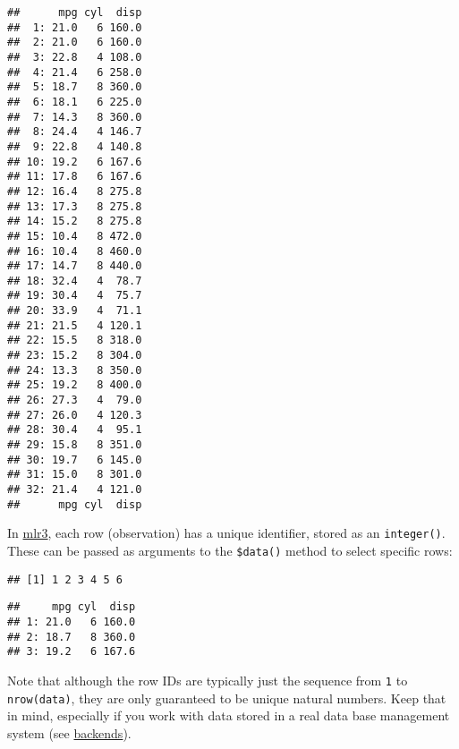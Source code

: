 \documentclass[
]{scrbook}
\newenvironment{Shaded}{\begin{snugshade}}{\end{snugshade}}
\newcommand{\AttributeTok}[1]{\textcolor[rgb]{0.77,0.63,0.00}{#1}}
\newcommand{\CommentTok}[1]{\textcolor[rgb]{0.56,0.35,0.01}{\textit{#1}}}
\newcommand{\DecValTok}[1]{\textcolor[rgb]{0.00,0.00,0.81}{#1}}
\newcommand{\FunctionTok}[1]{\textcolor[rgb]{0.00,0.00,0.00}{#1}}
\newcommand{\NormalTok}[1]{#1}
\newcommand{\SpecialCharTok}[1]{\textcolor[rgb]{0.00,0.00,0.00}{#1}}
\renewenvironment{Shaded} {\begin{snugshade}\small} {\end{snugshade}}
\begin{document}
\begin{verbatim}
##      mpg cyl  disp
##  1: 21.0   6 160.0
##  2: 21.0   6 160.0
##  3: 22.8   4 108.0
##  4: 21.4   6 258.0
##  5: 18.7   8 360.0
##  6: 18.1   6 225.0
##  7: 14.3   8 360.0
##  8: 24.4   4 146.7
##  9: 22.8   4 140.8
## 10: 19.2   6 167.6
## 11: 17.8   6 167.6
## 12: 16.4   8 275.8
## 13: 17.3   8 275.8
## 14: 15.2   8 275.8
## 15: 10.4   8 472.0
## 16: 10.4   8 460.0
## 17: 14.7   8 440.0
## 18: 32.4   4  78.7
## 19: 30.4   4  75.7
## 20: 33.9   4  71.1
## 21: 21.5   4 120.1
## 22: 15.5   8 318.0
## 23: 15.2   8 304.0
## 24: 13.3   8 350.0
## 25: 19.2   8 400.0
## 26: 27.3   4  79.0
## 27: 26.0   4 120.3
## 28: 30.4   4  95.1
## 29: 15.8   8 351.0
## 30: 19.7   6 145.0
## 31: 15.0   8 301.0
## 32: 21.4   4 121.0
##      mpg cyl  disp
\end{verbatim}

In \href{https://mlr3.mlr-org.com}{mlr3}, each row (observation) has a unique identifier, stored as an \texttt{integer()}.
These can be passed as arguments to the \texttt{\$data()} method to select specific rows:

\begin{Shaded}
\end{Shaded}

\begin{verbatim}
## [1] 1 2 3 4 5 6
\end{verbatim}

\begin{Shaded}
\end{Shaded}

\begin{verbatim}
##     mpg cyl  disp
## 1: 21.0   6 160.0
## 2: 18.7   8 360.0
## 3: 19.2   6 167.6
\end{verbatim}

Note that although the row IDs are typically just the sequence from \texttt{1} to \texttt{nrow(data)}, they are only guaranteed to be unique natural numbers.
Keep that in mind, especially if you work with data stored in a real data base management system (see \protect\hyperlink{backends}{backends}).
\end{document}

